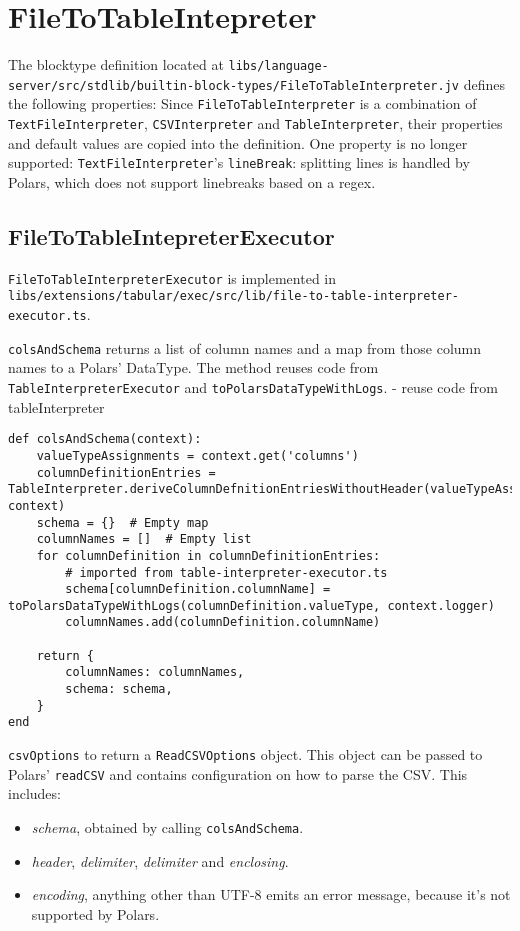 \section{FileToTableIntepreter}
The blocktype definition located at \Verb|libs/language-server/src/stdlib/builtin-block-types/FileToTableInterpreter.jv| defines the following properties:
Since \Verb|FileToTableInterpreter| is a combination of \Verb|TextFileInterpreter|, \Verb|CSVInterpreter| and \Verb|TableInterpreter|, their properties and default values are copied into the definition.
One property is no longer supported:
\Verb|TextFileInterpreter|'s \Verb|lineBreak|: splitting lines is handled by Polars, which does not support linebreaks based on a \ac{regex}.

\subsection{FileToTableIntepreterExecutor}
\Verb|FileToTableInterpreterExecutor| is implemented in \Verb|libs/extensions/tabular/exec/src/lib/file-to-table-interpreter-executor.ts|.

\Verb|colsAndSchema| returns a list of column names and a map from those column names to a Polars' DataType.
The method reuses code from \Verb|TableInterpreterExecutor| and \Verb|toPolarsDataTypeWithLogs|.
- reuse code from tableInterpreter
\begin{listing}
	\begin{verbatim}
def colsAndSchema(context):
	valueTypeAssignments = context.get('columns')
	columnDefinitionEntries = TableInterpreter.deriveColumnDefnitionEntriesWithoutHeader(valueTypeAssignments, context)
	schema = {}  # Empty map
	columnNames = []  # Empty list
	for columnDefinition in columnDefinitionEntries:
		# imported from table-interpreter-executor.ts
		schema[columnDefinition.columnName] = toPolarsDataTypeWithLogs(columnDefinition.valueType, context.logger)
		columnNames.add(columnDefinition.columnName)

	return {
		columnNames: columnNames,
		schema: schema,
	}
end
	\end{verbatim}
\end{listing}

\Verb|csvOptions| to return a \Verb|ReadCSVOptions| object.
This object can be passed to Polars' \Verb|readCSV| and contains configuration on how to parse the \ac{CSV}.
This includes:
\begin{itemize}
	\item \emph{schema}, obtained by calling \Verb|colsAndSchema|.
	\item \emph{header}, \emph{delimiter}, \emph{delimiter} and \emph{enclosing}.
	\item \emph{encoding}, anything other than UTF-8 emits an error message, because it's not supported by Polars.
\end{itemize}

